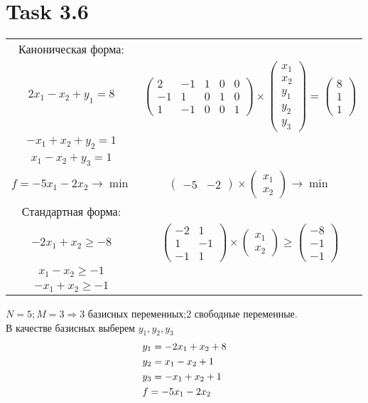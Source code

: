 \documentclass[12pt]{article}
\begin{document}
\section*{Task 3.6}
\begin{center}
  \begin{tabular}{|c|c|}
    \hline
    Каноническая форма:&\\
    $2x_1-x_2+y_1= 8$&$\begin{pmatrix}2&-1&1&0&0\\-1&1&0&1&0\\1&-1&0&0&1\end{pmatrix}
    \times\begin{pmatrix}x_1\\x_2\\y_1\\y_2\\y_3\end{pmatrix}
    =\begin{pmatrix}8\\1\\1\end{pmatrix} $\\
    $-x_1+x_2+y_2= 1$&\\
    $x_1-x_2+y_3= 1$&\\
    $f=-5x_1-2x_2\to\min$&$\begin{pmatrix}-5&-2\end{pmatrix}\times \begin{pmatrix}x_1\\x_2\end{pmatrix}\to\min$\\
    \hline
    Стандартная форма:&\\
    $-2x_1+x_2 \geqslant -8$&$\begin{pmatrix}-2&1\\1&-1\\-1&1\end{pmatrix}
    \times\begin{pmatrix}x_1\\x_2\end{pmatrix}
    \geqslant\begin{pmatrix}-8\\-1\\-1\end{pmatrix} $ \\
    $x_1-x_2 \geqslant -1$&\\
    $-x_1+x_2 \geqslant -1$&\\
    \hline
  \end{tabular}
\end{center}
$N=5; M=3\Rightarrow 3$ базисных переменных;$2$ свободные переменные.\\
В качестве базисных выберем $y_1,y_2,y_3$
\begin{align}
&y_1=-2x_1+x_2+8 \notag\\
&y_2=x_1-x_2+ 1\\
&y_3=-x_1+x_2+1 \notag\\
&f=-5x_1-2x_2\notag
\end{align}
\end{document}
